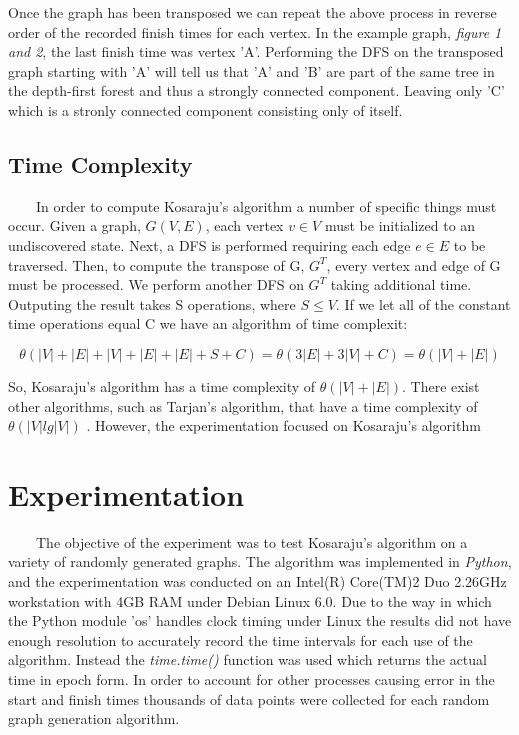 \documentclass[12pt]{article}
\begin{document}
Once the graph has been transposed we can repeat the above process in reverse order of the recorded finish times for each vertex. In the example graph, \emph{figure 1 and 2}, the last finish time was vertex 'A'. Performing the DFS on the transposed graph starting with 'A' will tell us that 'A' and 'B' are part of the same tree in the depth-first forest and thus a strongly connected component. Leaving only 'C' which is a stronly connected component consisting only of itself. 

  \subsection{Time Complexity}
\ \ \ \ In order to compute Kosaraju's algorithm a number of specific things must occur. Given a graph, $ G(V,E) $, each vertex $v \in V$ must be initialized to an undiscovered state. Next, a DFS is performed requiring each edge $e \in E$ to be traversed. Then, to compute the transpose of G, $ G^T $, every vertex and edge of G must be processed. We perform another DFS on $ G^T $ taking additional time. Outputing the result takes S operations, where $ S \le V$. If we let all of the constant time operations equal C we have an algorithm of time complexit:

\[
\theta(|V| + |E| + |V| + |E| + |E| + S + C) = \theta(3|E| + 3|V| + C) = \theta(|V| + |E|)
\]

So, Kosaraju's algorithm has a time complexity of $ \theta(|V| + |E|) $. There exist other algorithms, such as Tarjan's algorithm, that have a time complexity of $ \theta(|V| lg |V|) $ \cite{Narahari}. However, the experimentation focused on Kosaraju's algorithm

\section{Experimentation}

\ \ \ \ The objective of the experiment was to test Kosaraju's algorithm on a variety of randomly generated graphs. The algorithm was implemented in \emph{Python}, and the experimentation was conducted on an Intel(R) Core(TM)2 Duo 2.26GHz workstation with 4GB RAM under Debian Linux 6.0. Due to the way in which the Python module 'os' handles clock timing under Linux the results did not have enough resolution to accurately record the time intervals for each use of the algorithm. Instead the \emph{time.time()} function was used which returns the actual time in epoch form. In order to account for other processes causing error in the start and finish times thousands of data points were collected for each random graph generation algorithm. 
\end{document}
